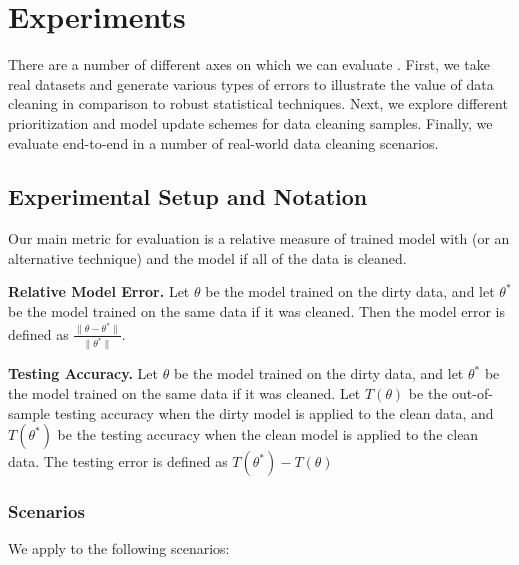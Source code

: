 \section{Experiments}
There are a number of different axes on which we can evaluate \sys.
First, we take real datasets and generate various types of errors to illustrate the value of data cleaning in comparison to robust statistical techniques.
Next, we explore different prioritization and model update schemes for data cleaning samples.
Finally, we evaluate \sys end-to-end in a number of real-world data cleaning scenarios.

\subsection{Experimental Setup and Notation}
Our main metric for evaluation is a relative measure of trained model with \sys (or an alternative technique) and the model if all of the data is cleaned.

\vspace{0.5em}

\noindent\textbf{Relative Model Error. } Let $\theta$ be the model trained on the dirty data, and let $\theta^*$ be the model trained on the same data if it was cleaned. Then the model error is defined as $\frac{\|\theta - \theta^*\|}{\|\theta^*\|}$.

\vspace{0.5em}

\noindent\textbf{Testing Accuracy. } Let $\theta$ be the model trained on the dirty data, and let $\theta^*$ be the model trained on the same data if it was cleaned. Let $T(\theta)$ be the out-of-sample testing accuracy when the dirty model is applied to the clean data, and $T(\theta^*)$ be the testing accuracy when the clean model is applied to the clean data. The testing error is defined as $T(\theta^*) - T(\theta)$

\subsubsection{Scenarios}
\noindent We apply \sys to the following scenarios:



